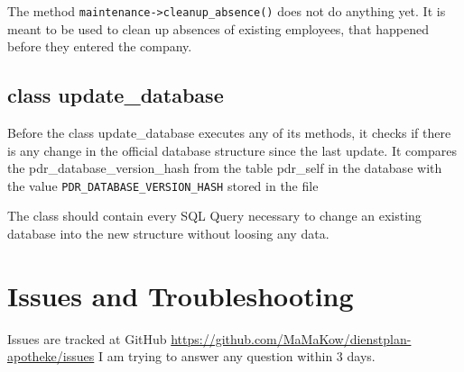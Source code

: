 The method \lstinline|maintenance->cleanup_absence()| does not do anything yet. It is meant to be used to clean up absences of existing employees, that happened before they entered the company.


\subsection{class update\_database}
Before the class update\_database executes any of its methods, it checks if there is any change in the official database structure since the last update.
It compares the pdr\_database\_version\_hash from the table pdr\_self in the database with the value \lstinline|PDR_DATABASE_VERSION_HASH| stored in the file 

The class should contain every SQL Query necessary to change an existing database into the new structure without loosing any data.


\section{Issues and Troubleshooting}
Issues are tracked at GitHub \url{https://github.com/MaMaKow/dienstplan-apotheke/issues}
I am trying to answer any question within 3 days.
